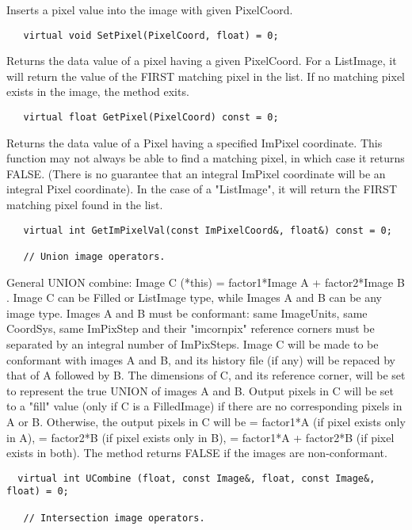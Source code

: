      Inserts a pixel value into the image with given PixelCoord.
\begin{verbatim}
   virtual void SetPixel(PixelCoord, float) = 0;

\end{verbatim}

      Returns the data value of a pixel having a  given PixelCoord.
      For a ListImage, it will return the value of the FIRST matching
      pixel in the list. If no matching pixel exists in the image,
      the method exits. 
\begin{verbatim}
   virtual float GetPixel(PixelCoord) const = 0;

\end{verbatim}

      Returns the data value of a Pixel having a specified ImPixel coordinate. 
      This function may not always be able to find a matching pixel, in which 
      case it returns FALSE. (There is no guarantee that an integral ImPixel
      coordinate will be an integral Pixel coordinate). In the case of a 
      "ListImage", it will return the FIRST matching pixel found in the list. 
\begin{verbatim}
   virtual int GetImPixelVal(const ImPixelCoord&, float&) const = 0;
 
   // Union image operators.
\end{verbatim}

      General UNION combine: Image C (*this) = factor1*Image A + 
      factor2*Image B . Image C can be Filled or ListImage type, while
      Images A and B can be any image type. Images A and B must be 
      conformant: same ImageUnits, same CoordSys, same ImPixStep and
      their "imcornpix" reference corners must be separated by an
      integral number of ImPixSteps. Image C will be made to be conformant
      with images A and B, and its history file (if any) will be repaced
      by that of A followed by B. The dimensions of C, and its reference
      corner, will be set to represent the true UNION of images A and B.
      Output pixels in C will be set to a "fill" value (only if C is
      a FilledImage) if there are no corresponding pixels in A or B.
      Otherwise, the output pixels in C will be = factor1*A (if pixel
      exists only in A), = factor2*B (if pixel exists only in B), 
      = factor1*A + factor2*B (if pixel exists in both). The method returns
      FALSE if the images are non-conformant.
\begin{verbatim}
  virtual int UCombine (float, const Image&, float, const Image&, float) = 0;

   // Intersection image operators.
\end{verbatim}

